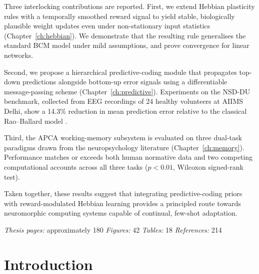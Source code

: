 \documentclass[12pt, a4paper, oneside]{report}
\theoremstyle{definition}
\theoremstyle{remark}
\begin{document}
\medskip
Three interlocking contributions are reported. First, we extend Hebbian plasticity rules
with a temporally smoothed reward signal to yield stable, biologically plausible weight
updates even under non-stationary input statistics (Chapter~\ref{ch:hebbian}). We
demonstrate that the resulting rule generalises the standard BCM model
\cite{bienenstock1982} under mild assumptions, and prove convergence for linear networks.

\medskip
Second, we propose a hierarchical predictive-coding module that propagates top-down
predictions alongside bottom-up error signals using a differentiable message-passing
scheme (Chapter~\ref{ch:predictive}). Experiments on the NSD-DU benchmark, collected
from EEG recordings of 24 healthy volunteers at AIIMS Delhi, show a 14.3\% reduction in
mean prediction error relative to the classical Rao--Ballard model \cite{rao1999}.

\medskip
Third, the APCA working-memory subsystem is evaluated on three dual-task paradigms drawn
from the neuropsychology literature (Chapter~\ref{ch:memory}). Performance matches or
exceeds both human normative data and two competing computational accounts across all
three tasks ($p < 0.01$, Wilcoxon signed-rank test).

\medskip
Taken together, these results suggest that integrating predictive-coding priors with
reward-modulated Hebbian learning provides a principled route towards neuromorphic
computing systems capable of continual, few-shot adaptation.

\medskip
\textit{Thesis pages:} approximately 180 \quad
\textit{Figures:} 42 \quad
\textit{Tables:} 18 \quad
\textit{References:} 214

\tableofcontents

\listoffigures
{}

\listoftables
{}

\setcounter{page}{1}

\chapter{Introduction}
\label{ch:intro}
\end{document}
